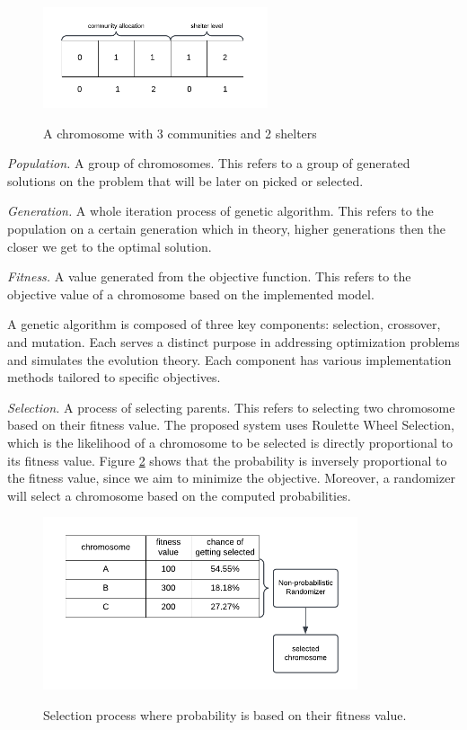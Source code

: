 	\begin{figure}[h!]
		\caption{A chromosome with 3 communities and 2 shelters}
		\centering
		\includegraphics[width=250px]{Chromosome}
		\label{Chromosome}
	\end{figure}
	
	\textit{Population.} A group of chromosomes. This refers to a group of generated solutions on the problem that will be later on picked or selected.
	
	\textit{Generation.} A whole iteration process of genetic algorithm. This refers to the population on a certain generation which in theory, higher generations then the closer we get to the optimal solution.
	
	\textit{Fitness.} A value generated from the objective function. This refers to the objective value of a chromosome based on the implemented model.
	
	A genetic algorithm is composed of three key components: selection, crossover, and mutation. Each serves a distinct purpose in addressing optimization problems and simulates the evolution theory. Each component has various implementation methods tailored to specific objectives. \parencite{Eyal2020}
	
	\textit{Selection.} A process of selecting parents. This refers to selecting two chromosome based on their fitness value. The proposed system uses Roulette Wheel Selection, which is the likelihood of a chromosome to be selected is directly proportional to its fitness value. Figure \ref{Selection} shows that the probability is inversely proportional to the fitness value, since we aim to minimize the objective. Moreover, a randomizer will select a chromosome based on the computed probabilities.
	
	\begin{figure}[h!]
		\caption{Selection process where probability is based on their fitness value.}
		\centering
		\includegraphics[width=350px]{Selection}
		\label{Selection}
	\end{figure}
	
